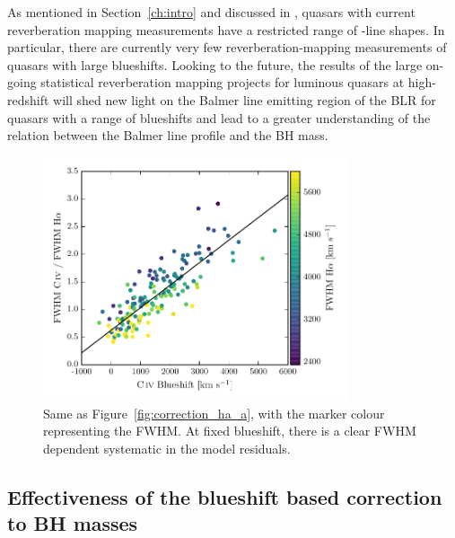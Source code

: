 As mentioned in Section~\ref{ch:intro} and discussed in \citet{richards11}, quasars with current reverberation mapping measurements have a restricted range of -line shapes. 
In particular, there are currently very few reverberation-mapping measurements of quasars with large  blueshifts. 
Looking to the future, the results of the large on-going statistical reverberation mapping projects \citep[e.g.][]{shen15,kingoz15} for luminous quasars at high-redshift will shed new light on the Balmer line emitting region of the BLR for quasars with a range of  blueshifts and lead to a greater understanding of the relation between the Balmer line profile and the BH mass.

\begin{figure}
    \centering 
    \includegraphics[width=0.8\textwidth]{figures/chapter03/fwhm_correction_color.pdf}  
    \caption[{Same as Figure~\ref{fig:correction_ha_a}, with the marker colour representing the \ha FWHM.}]{Same as Figure~\ref{fig:correction_ha_a}, with the marker colour representing the \ha FWHM. At fixed  blueshift, there is a clear \ha FWHM dependent systematic in the model residuals.}   
    \label{fig:residuals_ha_fwhm}
\end{figure}

\subsection{Effectiveness of the  blueshift based correction to BH masses}
\label{sec:effectiveness}


